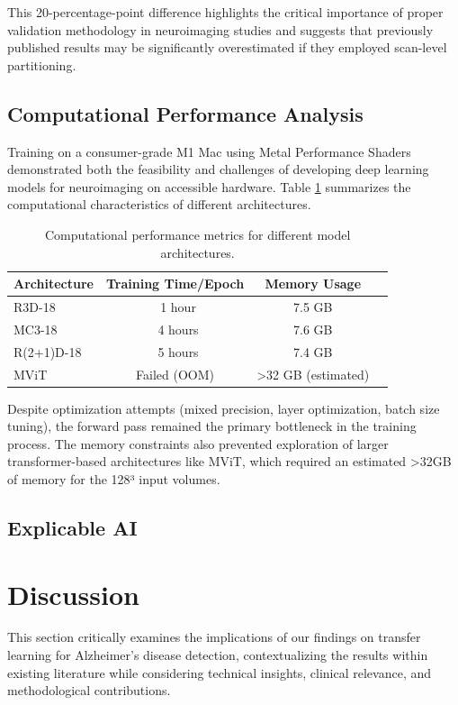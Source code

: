 \documentclass[12pt, a4paper]{article}
\begin{document}
This 20-percentage-point difference highlights the critical importance of proper validation methodology in neuroimaging studies and suggests that previously published results may be significantly overestimated if they employed scan-level partitioning.

\subsection{Computational Performance Analysis}

Training on a consumer-grade M1 Mac using Metal Performance Shaders demonstrated both the feasibility and challenges of developing deep learning models for neuroimaging on accessible hardware. Table \ref{tab:computational_performance} summarizes the computational characteristics of different architectures.

\begin{table}[htbp]
\centering
\begin{tabular}{|l|c|c|c|}
\hline
\textbf{Architecture} & \textbf{Training Time/Epoch} & \textbf{Memory Usage} \\
\hline
R3D-18 & ~1 hour & 7.5 GB \\
\hline
MC3-18 & ~4 hours & 7.6 GB \\
\hline
R(2+1)D-18 & ~5 hours & 7.4 GB \\
\hline
MViT & Failed (OOM) & >32 GB (estimated) \\
\hline
\end{tabular}
\caption{Computational performance metrics for different model architectures.}
\label{tab:computational_performance}
\end{table}

Despite optimization attempts (mixed precision, layer optimization, batch size tuning), the forward pass remained the primary bottleneck in the training process. The memory constraints also prevented exploration of larger transformer-based architectures like MViT, which required an estimated >32GB of memory for the 128³ input volumes.

\subsection{Explicable AI}

\section{Discussion}
This section critically examines the implications of our findings on transfer learning for Alzheimer's disease detection, contextualizing the results within existing literature while considering technical insights, clinical relevance, and methodological contributions.
\end{document}
